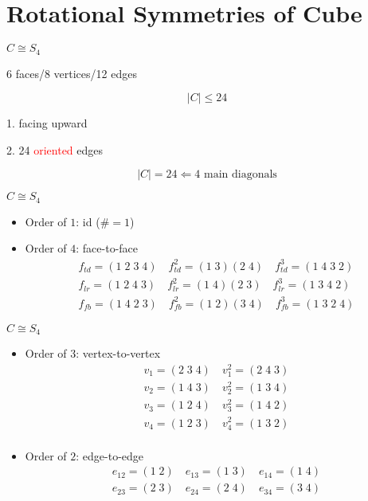 \section{Rotational Symmetries of Cube}

\begin{frame}{$C \cong S_4$}
  \centerline{6 faces/8 vertices/12 edges}

  \pause
  \[
    |C| \le 24
  \]

  \pause
  \vspace{0.6cm}
  \centerline{1. facing upward}

  \vspace{0.4cm}
  \centerline{2. 24 \textcolor{red}{oriented} edges}

  \pause
  \[
    |C| = 24 \Leftarrow 4 \text{ main diagonals}
  \]
\end{frame}
\begin{frame}{$C \cong S_4$}
  \begin{itemize}
    \item Order of $1$: id ($\# = 1$)
    \item Order of $4$: face-to-face
      \begin{align*}
	 f_{td} = (1\;2\;3\;4) \quad f_{td}^{2} = (1\;3) (2\;4)  \quad f_{td}^{3} = (1\;4\;3\;2) \\
	 f_{lr} = (1\;2\;4\;3) \quad f_{lr}^{2} = (1\;4) (2\;3)  \quad f_{lr}^{3} = (1\;3\;4\;2) \\
	 f_{fb} = (1\;4\;2\;3) \quad f_{fb}^{2} = (1\;2) (3\;4)  \quad f_{fb}^{3} = (1\;3\;2\;4)
      \end{align*}
  \end{itemize}
\end{frame}
\begin{frame}{$C \cong S_4$}
  \begin{itemize}
    \item Order of $3$: vertex-to-vertex
      \begin{align*}
        v_{1} = (2\;3\;4) \quad v_{1}^{2} = (2\;4\;3) \\
        v_{2} = (1\;4\;3) \quad v_{2}^{2} = (1\;3\;4) \\
        v_{3} = (1\;2\;4) \quad v_{3}^{2} = (1\;4\;2) \\
        v_{4} = (1\;2\;3) \quad v_{4}^{2} = (1\;3\;2) \\
      \end{align*}
    \item Order of $2$: edge-to-edge
      \begin{align*}
        e_{12} = (1\;2) \quad e_{13} = (1\;3) \quad e_{14} = (1\;4) \\
        e_{23} = (2\;3) \quad e_{24} = (2\;4) \quad e_{34} = (3\;4)
      \end{align*}
  \end{itemize}
\end{frame}
